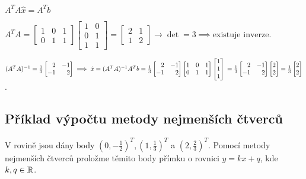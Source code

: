 $A^T A \hat x = A^T b$

$A^T A = 
\begin{bmatrix}
    1 & 0 & 1 \\
    0 & 1 & 1
\end{bmatrix}
\begin{bmatrix}
    1 & 0 \\
    0 & 1 \\
    1 & 1
\end{bmatrix}
=
\begin{bmatrix}
    2 & 1 \\
    1 & 2 
\end{bmatrix} 
\rightarrow \det = 3 \implies \text{existuje inverze.}$

$(A^T A)^{-1} = \frac{1}{3}
\begin{bmatrix}
    \phantom{-}2 & -1 \\
    -1 & \phantom{-}2 
\end{bmatrix} \implies \hat x = (A^T A)^{-1}A^T b = \frac{1}{3}
\begin{bmatrix}
    \phantom{-}2 & -1 \\
    -1 & \phantom{-}2 
\end{bmatrix}
\begin{bmatrix}
    1 & 0 & 1 \\
    0 & 1 & 1
\end{bmatrix}
\begin{bmatrix}
    1 \\
    1 \\
    1 
\end{bmatrix}\\ 
= \frac{1}{3}
\begin{bmatrix}
    \phantom{-}2 & -1 \\
    -1 & \phantom{-}2 
\end{bmatrix}
\begin{bmatrix}
    2 \\
    2 
\end{bmatrix} = \frac{1}{3}
\begin{bmatrix}
    2 \\
    2 
\end{bmatrix}$.

\subsection{Příklad výpočtu metody nejmenších čtverců}
V rovině jsou dány body $(0, -\frac{1}{2})^T, (1, \frac{1}{3})^T$ a $(2, \frac{2}{3})^T$. Pomocí metody nejmenších 
čtverců proložme těmito body přímku o rovnici $y = kx + q$, kde $k ,q \in \mathbb{R}$.

